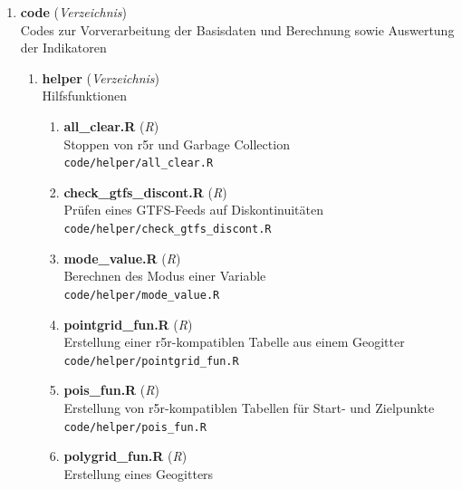 

\begin{enumerate}[label=\arabic*, leftmargin=*, itemsep=0.5em, topsep=0.3em]
\item \textbf{code} \textnormal{(\textit{Verzeichnis})}\\
Codes zur Vorverarbeitung der Basisdaten und Berechnung sowie Auswertung der Indikatoren
\begin{enumerate}[label=\arabic{enumi}.\arabic*, leftmargin=*, itemsep=0.5em, topsep=0.3em]
\item \textbf{helper} \textnormal{(\textit{Verzeichnis})}\\
Hilfsfunktionen
\begin{enumerate}[label=\arabic{enumi}.\arabic{enumii}.\arabic*, leftmargin=*, itemsep=0.5em, topsep=0.3em]
\item \textbf{all\_clear.R} \textnormal{(\textit{R})}\\
Stoppen von r5r und Garbage Collection\\
\texttt{\small code/helper/all\_clear.R}
\item \textbf{check\_gtfs\_discont.R} \textnormal{(\textit{R})}\\
Prüfen eines GTFS-Feeds auf Diskontinuitäten\\
\texttt{\small code/helper/check\_gtfs\_discont.R}
\item \textbf{mode\_value.R} \textnormal{(\textit{R})}\\
Berechnen des Modus einer Variable\\
\texttt{\small code/helper/mode\_value.R}
\item \textbf{pointgrid\_fun.R} \textnormal{(\textit{R})}\\
Erstellung einer r5r-kompatiblen Tabelle aus einem Geogitter\\
\texttt{\small code/helper/pointgrid\_fun.R}
\item \textbf{pois\_fun.R} \textnormal{(\textit{R})}\\
Erstellung von r5r-kompatiblen Tabellen für Start- und Zielpunkte\\
\texttt{\small code/helper/pois\_fun.R}
\item \textbf{polygrid\_fun.R} \textnormal{(\textit{R})}\\
Erstellung eines Geogitters\\

\end{enumerate}
\end{enumerate}
\end{enumerate}
